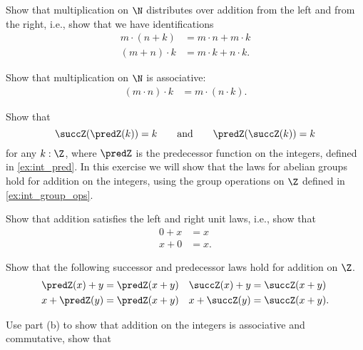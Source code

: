 \begin{exercises}
\begin{subexenum}
  \item \label{ex:distributive-mul-addN}Show that multiplication on $\N$ distributes over addition from the left and from the right, i.e., show that we have identifications
    \begin{align*}
      m\cdot (n+k) & = m\cdot n + m\cdot k \\
      (m+n)\cdot k & = m\cdot k + n\cdot k.
    \end{align*}
  \item Show that multiplication on $\N$ is associative:
    \begin{align*}
      (m\cdot n)\cdot k & = m\cdot (n\cdot k).
    \end{align*}
  \end{subexenum}
  \exitem \label{ex:is-equiv-succ-Z}Show that
  \begin{equation*}
    \succZ(\predZ(k))=k \qquad\text{and}\qquad \predZ(\succZ(k))=k
  \end{equation*}
  for any $k:\Z$, where $\predZ$ is the predecessor function on the integers, defined in \cref{ex:int_pred}.
  \exitem \label{ex:int_group_laws} In this exercise we will show that the laws for abelian groups hold for addition on the integers, using the group operations on $\Z$ defined in \cref{ex:int_group_ops}.
  \begin{subexenum}
  \item Show that addition satisfies the left and right unit laws, i.e., show that
    \begin{align*}
      0+x & = x \\
      x+0 & = x.
    \end{align*}
  \item Show that the following successor and predecessor laws hold for addition on $\Z$.
    \begin{align*}
      \predZ(x)+y & = \predZ(x+y) & \succZ(x)+y & = \succZ(x+y) \\
      x+\predZ(y) & = \predZ(x+y) & x+\succZ(y) & = \succZ(x+y).
    \end{align*}
  \item Use part (b) to show that addition on the integers is associative and commutative, show that
    \begin{align*}

\end{align*}
\end{subexenum}
\end{exercises}
